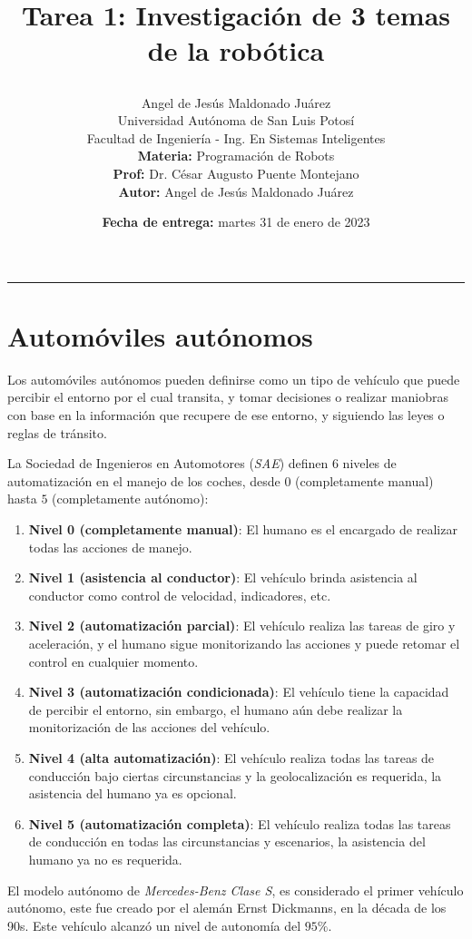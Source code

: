 \documentclass[a4paper, 12pt]{article}
\title{
    \vspace{-3cm}Tarea 1: Investigación de 3 temas de la robótica
    \author{
        Angel de Jesús Maldonado Juárez\\
        Universidad Autónoma de San Luis Potosí\\
        Facultad de Ingeniería - Ing. En Sistemas Inteligentes\\
        \textbf{Materia:} Programación de Robots\\
        \textbf{Prof:} Dr. César Augusto Puente Montejano\\
        \textbf{Autor:} Angel de Jesús Maldonado Juárez
    }
    \date{\textbf{Fecha de entrega:} martes 31 de enero de 2023}
}
\begin{document}
\maketitle

\hrule

\section*{Automóviles autónomos}
Los automóviles autónomos pueden definirse como un tipo de
vehículo que puede percibir el entorno por el cual transita,
y tomar decisiones o realizar maniobras con base en la
información que recupere de ese entorno, y siguiendo las leyes
o reglas de tránsito.

La Sociedad de Ingenieros en Automotores (\emph{SAE}) definen
6 niveles de automatización en el manejo de los coches, desde
$0$ (completamente manual) hasta $5$ (completamente autónomo):

\begin{enumerate}
    \item \textbf{Nivel 0 (completamente manual)}: El humano
          es el encargado de realizar todas las acciones de manejo.
    \item \textbf{Nivel 1 (asistencia al conductor)}: El
          vehículo brinda asistencia al conductor como control de
          velocidad, indicadores, etc.
    \item \textbf{Nivel 2 (automatización parcial)}: El
          vehículo realiza las tareas de giro y aceleración, y el
          humano sigue monitorizando las acciones y puede retomar el
          control en cualquier momento.
    \item \textbf{Nivel 3 (automatización condicionada)}: El
          vehículo tiene la capacidad de percibir el entorno, sin
          embargo, el humano aún debe realizar la monitorización de
          las acciones del vehículo.
    \item \textbf{Nivel 4 (alta automatización)}: El vehículo
          realiza todas las tareas de conducción bajo ciertas
          circunstancias y la geolocalización es requerida, la
          asistencia del humano ya es opcional.
    \item \textbf{Nivel 5 (automatización completa)}: El
          vehículo realiza todas las tareas de conducción en todas
          las circunstancias y escenarios, la asistencia del humano
          ya no es requerida.
\end{enumerate}
El modelo autónomo de \emph{Mercedes-Benz Clase S}, es considerado
el primer vehículo autónomo, este fue creado por el alemán Ernst
Dickmanns, en la década de los 90s. Este vehículo alcanzó un nivel
de autonomía del $95\%$.
\end{document}

